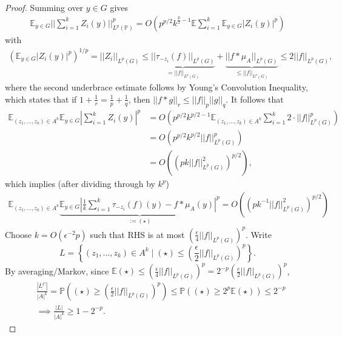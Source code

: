 \documentclass{article}
\theoremstyle{definition}
\begin{document}
\begin{proof}
    Summing over $y \in G$ gives 
    \begin{align*}
        \mathbb{E}_{y \in G} ||\sum_{i=1}^{k} Z_i(y)||_{L^p(\mathbb{P})}^{p} = O \left(p^{p/2}k^{\frac{p}{2}-1}\mathbb{E}\sum_{i=1}^{k} \mathbb{E}_{y \in G}\left|Z_i(y)\right|^p \right)
    \end{align*}
    with 
    \begin{align*}
        \left(\mathbb{E}_{y \in G}\left|Z_i(y)\right|^p \right)^{1/p} = ||Z_i||_{L^p(G)} \le  \underbrace{||\tau_{-z_i}(f)||_{L^p(G)}}_{= ||f||_{L^p(G)}} + \underbrace{||f * \mu_A||_{L^p(G)}}_{\le ||f||_{L^p(G)}} \le 2||f||_{L^p(G)},
    \end{align*}
    where the second underbrace estimate follows by Young's Convolution Inequality, which states that if $1+\frac{1}{r}=\frac{1}{p}+\frac{1}{q}$, then $||f * g||_r \le ||f||_{p} ||g||_{q}$. It follows that
    \begin{align*}
        \mathbb{E}_{(z_1,\ldots,z_k) \in A^k}\mathbb{E}_{y \in G} |\sum_{i=1}^{k} Z_i(y)|^p &= O \left(p^{p/2}k^{p/2-1}\mathbb{E}_{(z_1,\ldots,z_k) \in A^k}\sum_{i=1}^{k} 2\cdot ||f||^p_{L^p(G)} \right) \\
        &= O \left(p^{p/2}k^{p/2}||f||_{L^p(G)}^p \right)\\
        &= O \left((pk||f||^2_{L^p(G)})^{p/2}\right),
    \end{align*}
    which implies (after dividing through by $k^{p}$) 
    \begin{align*}
        \mathbb{E}_{(z_1,\ldots,z_k) \in A^k}\underbrace{\mathbb{E}_{y \in G}\left|\frac{1}{k}\sum_{i=1}^{k} \tau_{-z_i}(f)(y) - f * \mu_A (y)\right|^p}_{:= (\star)} = O \left((pk^{-1}||f||^2_{L^p(G)})^{p/2}\right)
    \end{align*}
    Choose $k = O(\epsilon^{-2}p)$ such that RHS is at most $\left(\frac{\epsilon}{4}||f||_{L^p(G)}\right)^{p}$. Write $$L = \left\{(z_1,\ldots,z_k) \in A^k \mid (\star) \le \left(\frac{\epsilon}{2}||f||_{L^p(G)}\right)^p \right\}.$$
    By averaging/Markov, since $\mathbb{E}(\star)\le \left(\frac{\epsilon}{4}||f||_{L^p(G)}\right)^p = 2^{-p} \left(\frac{e}{2}||f||_{L^p(G)}\right)^p$, 
    \begin{align*}
        &\frac{\left|L^C\right|}{\left|A\right|^k} = \mathbb{P}\left((\star)\ge \left(\frac{\epsilon}{2}||f||_{L^p(G)}\right)^p\right) \le \mathbb{P}\left((\star)\ge 2^{p}\mathbb{E}(\star)\right) \le 2^{-p} \\
        &\implies \frac{\left|L\right|}{\left|A\right|^k}\ge 1-2^{-p}.
    \end{align*}

\end{proof}
\end{document}
